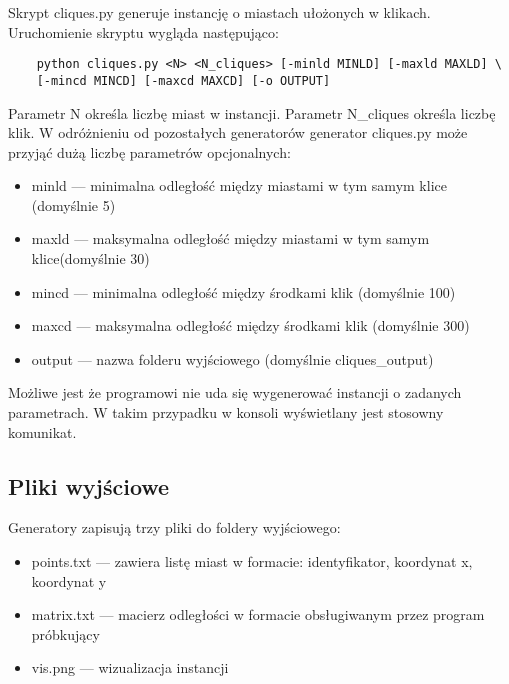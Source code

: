 Skrypt cliques.py generuje instancję o miastach ułożonych w klikach.
Uruchomienie skryptu wygląda następująco:
\begin{lstlisting}
    python cliques.py <N> <N_cliques> [-minld MINLD] [-maxld MAXLD] \ 
    [-mincd MINCD] [-maxcd MAXCD] [-o OUTPUT]
\end{lstlisting}
Parametr N określa liczbę miast w instancji. Parametr N\_cliques określa liczbę klik.
W odróżnieniu od pozostałych generatorów generator cliques.py może przyjąć dużą liczbę parametrów opcjonalnych:
\begin{itemize}
    \item minld --- minimalna odległość między miastami w tym samym klice (domyślnie 5)
    \item maxld --- maksymalna odległość między miastami w tym samym klice(domyślnie 30)
    \item mincd --- minimalna odległość między środkami klik (domyślnie 100)
    \item maxcd --- maksymalna odległość między środkami klik (domyślnie 300)
    \item output --- nazwa folderu wyjściowego (domyślnie cliques\_output)
\end{itemize}

Możliwe jest że programowi nie uda się wygenerować instancji o zadanych parametrach. W takim przypadku w konsoli wyświetlany jest stosowny komunikat.

\subsection{Pliki wyjściowe}
Generatory zapisują trzy pliki do foldery wyjściowego:
\begin{itemize}
    \item points.txt --- zawiera listę miast w formacie: identyfikator, koordynat x, koordynat y
    \item matrix.txt --- macierz odległości w formacie obsługiwanym przez program próbkujący
    \item vis.png --- wizualizacja instancji
\end{itemize}

